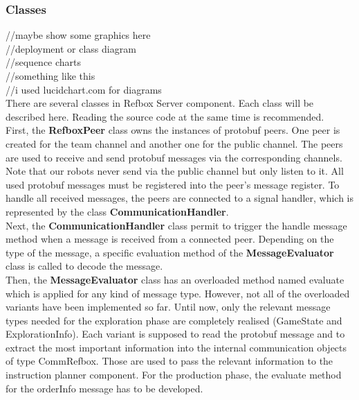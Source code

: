 \subsubsection{Classes}

//maybe show some graphics here \\
//deployment or class diagram  \\
//sequence charts  \\
//something like this \\

//i used lucidchart.com for diagrams \\

There are several classes in Refbox Server component. Each class will be described here. Reading the source code at the same time is recommended.\\

First, the \textbf{RefboxPeer} class owns the instances of protobuf peers. One peer is created for the team channel and another one for the public channel. The peers are used to receive and send protobuf messages via the corresponding channels. Note that our robots never send via the public channel but only listen to it. All used protobuf messages must be registered into the peer’s message register. To handle all received messages, the peers are connected to a signal handler, which is represented by the class \textbf{CommunicationHandler}. \\

Next, the \textbf{CommunicationHandler} class permit to trigger the handle message method when a message is received from a connected peer. Depending on the type of the message, a specific evaluation method of the \textbf{MessageEvaluator} class is called to decode the message.\\

Then, the \textbf{MessageEvaluator} class has an overloaded method named evaluate which is applied for any kind of message type. However, not all of the overloaded variants have been implemented so far. Until now, only the relevant message types needed for the exploration phase are completely realised (GameState and ExplorationInfo). Each variant is supposed to read the protobuf message and to extract the most important information into the internal communication objects of type CommRefbox. Those are used to pass the relevant information to the instruction planner component. For the production phase, the evaluate method for the orderInfo message has to be developed.\\

